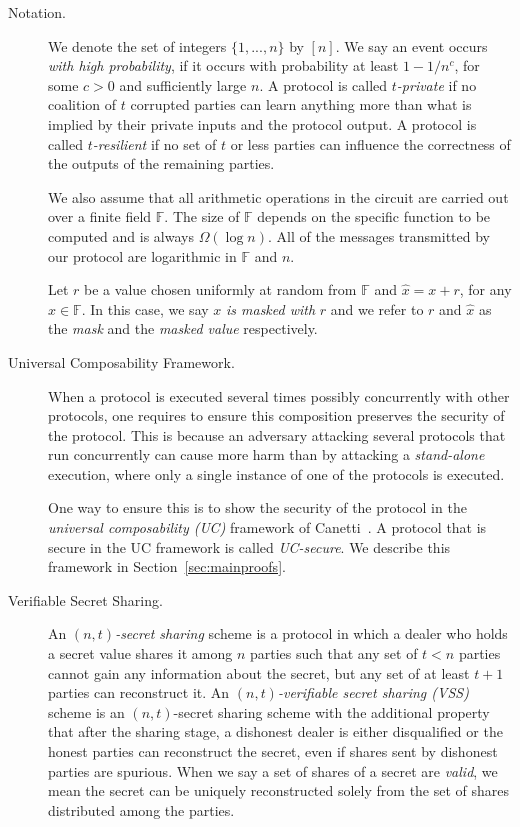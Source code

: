 \documentclass[11pt,letter]{article}
\newcommand{\mask}[1]{\widehat{#1}}
\newcommand{\F}{\mathbb{F}}
\theoremstyle{mytheoremstyle}
\begin{document}
\begin{description}
	\item[Notation.]
	We denote the set of integers $\{1,...,n\}$ by $[n]$. We say an event occurs \emph{with high probability}, if it occurs with probability at least $1-1/n^c$, for some $c>0$ and sufficiently large $n$. A protocol is called \emph{$t$-private} if no coalition of $t$ corrupted parties can learn anything more than what is implied by their private inputs and the protocol output. A protocol is called \emph{$t$-resilient} if no set of $t$ or less parties can influence the correctness of the outputs of the remaining parties.
	
	We also assume that all arithmetic operations in the circuit are carried out over a finite field $\F$. The size of $\F$ depends on the specific function to be computed and is always $\Omega(\log{n})$. All of the messages transmitted by our protocol are logarithmic in $\F$ and $n$.
	
	Let $r$ be a value chosen uniformly at random from $\F$ and $\mask{x} = x + r$, for any $x \in \F$. In this case, we say $x$ \emph{is masked with} $r$ and we refer to $r$ and $\mask{x}$ as the \emph{mask} and the \emph{masked value} respectively.




	\item[Universal Composability Framework.] When a protocol is executed several times possibly concurrently with other protocols, one requires to ensure this composition preserves the security of the protocol. This is because an adversary attacking several protocols that run concurrently can cause more harm than by attacking a \emph{stand-alone} execution, where only a single instance of one of the protocols is executed. 
	
	One way to ensure this is to show the security of the protocol in the \emph{universal composability (UC)} framework of Canetti~\cite{Canetti:UCSecurity:2001}. A protocol that is secure in the UC framework is called \emph{UC-secure}. We describe this framework in Section~\ref{sec:mainproofs}. 



	\item[Verifiable Secret Sharing.]
	An \emph{$(n,t)$-secret sharing} scheme is a protocol in which a dealer who holds a secret value shares it among $n$ parties such that any set of $t<n$ parties cannot gain any information about the secret, but any set of at least
	$t+1$ parties can reconstruct it. An \emph{$(n,t)$-verifiable secret sharing (VSS)} scheme is an \emph{$(n,t)$}-secret sharing scheme with the additional property that after the sharing stage, a dishonest dealer is either disqualified or the honest parties can reconstruct the secret, even if shares sent by dishonest parties are spurious. When we say a set of shares of a secret are \emph{valid}, we mean the secret can be uniquely reconstructed solely from the set of shares distributed among the parties.
	

\end{description}
\end{document}
